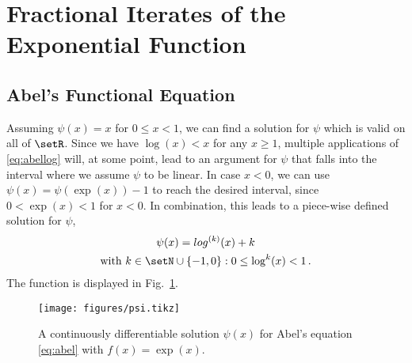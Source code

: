 \section{Fractional Iterates of the Exponential Function} \label{sec:frac}

\subsection{Abel's Functional Equation}

Assuming $\psi(x) = x$ for $0 \leq x < 1$, we can find a solution for $\psi$ which is valid on all of $\setR$. 
Since we have $\log(x) < x$ for any $x \geq 1$, multiple applications of \eqref{eq:abellog} will, at some point, lead to an argument for $\psi$ that falls into the interval where we assume $\psi$ to be linear. 
In case $x<0$, we can use $\psi(x) = \psi(\exp(x)) -1$ to reach the desired interval, since $0 < \exp(x) < 1$ for $x < 0$. 
In combination, this leads to a piece-wise defined solution for $\psi$,
\begin{subequations}
\begin{gather}
\label{eq:psi}
\psi(x) = log^{(k)}(x) + k \\
\label{eq:psicond}
\text{with }k \in \setN \cup \{-1,0\}: 0 \leq \log^{k} (x) < 1 \,.
\end{gather}
\end{subequations}
The function is displayed in Fig.~\ref{fig:psi}.

\begin{figure}
\centering
\texttt{[image: figures/psi.tikz]}
\caption{A continuously differentiable solution $\psi(x)$ for Abel's equation \eqref{eq:abel} with $f(x) = \exp(x).$}
\label{fig:psi}
\end{figure}